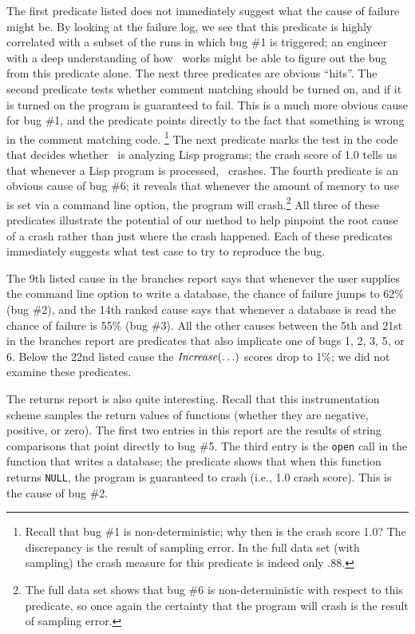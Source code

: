 The first predicate listed does not immediately suggest what the cause
of failure might be. By looking at the failure log, we see that this predicate
is highly correlated with a subset of the runs in which bug \#1 is
triggered; an engineer with a deep understanding of how \moss\ works
might be able to figure out the bug from this predicate alone.
The next three predicates are obvious ``hits''. The second predicate
tests whether comment matching should be turned on, and if it is turned on the program is
guaranteed to fail. This is a much more obvious cause for bug \#1, and the predicate points directly
to the fact that something is wrong in the comment matching code.
\footnote{Recall that bug \#1 is non-deterministic; why then is the crash score 1.0?
The discrepancy is the result of sampling error.  In the full data set
(with  sampling) the crash measure for this predicate is indeed
only .88.}
The
next predicate marks the test in the code that decides whether \moss\ is analyzing Lisp
programs; the crash score of 1.0 tells us that whenever a Lisp program is
processed, \moss\ crashes.  The fourth predicate
is an obvious cause of
bug \#6; it reveals that whenever the amount of memory to use is set
via a command line option, the program will crash.\footnote{The full data set shows that bug \#6 is non-deterministic with respect to this predicate, so once again the certainty that the program will crash is the result of sampling error.}  All three of these predicates illustrate the potential of our method to
help pinpoint the root cause of a crash rather than just where the crash
happened.  Each of these predicates immediately suggests
what test case to try to reproduce the bug.

The 9th listed cause in the branches report says that whenever the
user supplies the command line option to write a database, the chance
of failure jumps to 62\% (bug \#2), and the 14th ranked cause says
that whenever a database is read the chance of failure is 55\% (bug
\#3).  All the other causes between the 5th and 21st in the branches
report are predicates that also implicate one of bugs 1, 2, 3, 5, or
6.  Below the 22nd listed cause the $\mbox{\textit{Increase}}(\ldots)$ scores drop to
1\%; we did not examine these predicates.

The returns report is also quite interesting.  Recall that this
instrumentation scheme samples the return values of functions (whether
they are negative, positive, or zero).  The first two entries in this
report are the results of string comparisons that point directly to bug
\#5.  The third entry is the {\tt open} call in the function that writes
a database; the predicate shows that when this function returns {\tt NULL},
the program is guaranteed to crash (i.e., 1.0 crash score).  This is the
cause of bug \#2.

